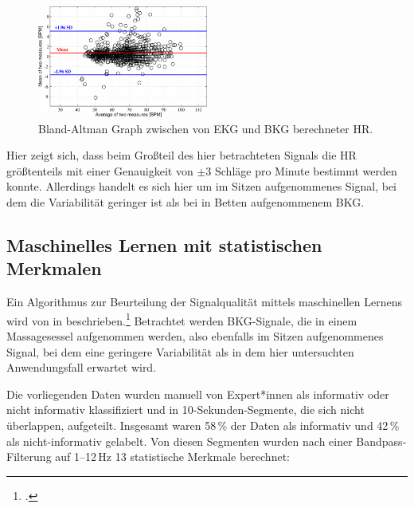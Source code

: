 	\begin{figure}[H]
		\centering
		\includegraphics[width=0.5\textwidth]{pic/bland-altman-pino.png}
		\caption[Genauigkeit der Herzratenberechnung bei schwellwertbasierter Artefakterkennung]{Bland-Altman Graph zwischen von \ac{EKG} und \ac{BKG} berechneter \ac{HR}.}
		\label{fig:bland-altman-pino}
	\end{figure}
	
	Hier zeigt sich, dass beim Großteil des hier betrachteten Signals die \ac{HR} größtenteils mit einer Genauigkeit von $\pm 3$ Schläge pro Minute bestimmt werden konnte. Allerdings handelt es sich hier um im Sitzen aufgenommenes Signal, bei dem die Variabilität geringer ist als bei in Betten aufgenommenem \ac{BKG}.
	
	
	\subsection{Maschinelles Lernen mit statistischen Merkmalen}\label{ml-beschreibung}	
	
	Ein Algorithmus zur Beurteilung der Signalqualität mittels maschinellen Lernens wird von \citeauthor{Sadek2016} in  beschrieben.\footcite{Sadek2016} Betrachtet werden \ac{BKG}-Signale, die in einem Massagesessel aufgenommen werden, also ebenfalls im Sitzen aufgenommenes Signal, bei dem eine geringere Variabilität als in dem hier untersuchten Anwendungsfall erwartet wird.
	
	Die vorliegenden Daten wurden manuell von Expert*innen als informativ oder nicht informativ klassifiziert und in 10-Sekunden-Segmente, die sich nicht überlappen, aufgeteilt. Insgesamt waren 58\,\% der Daten als informativ und 42\,\% als nicht-informativ gelabelt. Von diesen Segmenten wurden nach einer Bandpass-Filterung auf \numrange{1}{12}\,Hz 13 statistische Merkmale berechnet:

